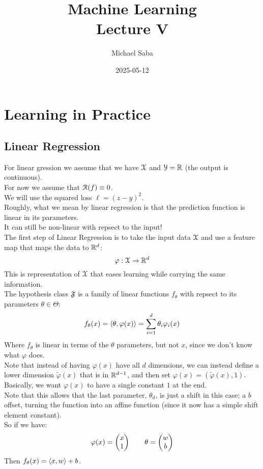 \documentclass[12pt]{article}
\title{%
    \Huge Machine Learning \\
    \Large Lecture V
}
\date{2025-05-12}
\author{Michael Saba}
\begin{document}
\maketitle
\newpage
\setlength{\parindent}{0pt}

\section*{Learning in Practice}

\subsection*{Linear Regression}

For linear gression we assume that
we have $\mathcal{X}$ and $\mathcal{Y} = \mathbb{R}$
(the output is continuous). \\

For now we assume that $\mathcal{R}(f) \equiv 0$. \\

We will use the squared loss $\ell = (z- y)^2$. \\

Roughly, what we mean by linear regression is that
the prediction function is linear in its parameters. \\
It can still be non-linear with repsect to
the input! \\

The first step of Linear Regression is 
to take the input data $\mathcal{X}$ and use a feature
map that maps the data to $\mathbb{R}^d$:
\[ \varphi: \mathcal{X} \to \mathbb{R}^d \]
This is representation of $\mathcal{X}$ 
that eases learning while carrying the same
information. \\

The hypothesis class $\mathfrak{F}$ is a family of
linear functions $f_\theta$ with
repsect to its parameters $\theta \in \Theta$:
\[ f_\theta(x) = \left\langle \theta, \varphi(x) \right\rangle
= \sum_{i = 1}^d \theta_i \varphi_i(x) \]
Where $f_\theta$ is linear in terms of the
$\theta$ parameters, but not $x$,
since we don't know what $\varphi$ does. \\

Note that instead of having $\varphi(x)$
have all $d$ dimensions, we can instead define
a lower dimension $\tilde{\varphi}(x)$
that is in $\mathbb{R}^{d-1}$,
and then set $\varphi(x) = (\tilde{\varphi}(x), 1)$. \\
Basically, we want $\varphi(x)$ to have
a single constant $1$ at the end. \\
Note that this allows that the last parameter,
$\theta_d$, is just a shift in this case;
a $b$ offset,
turning the function into an affine function
(since it now has a simple shift element constant). \\
So if we have:
\[ \varphi(x) = \begin{pmatrix} x \\ 1 \end{pmatrix} \qquad
\theta = \begin{pmatrix} w \\ b \end{pmatrix} \] 
Then $f_\theta(x) = \left\langle x, w \right\rangle + b$. \\
\end{document}
